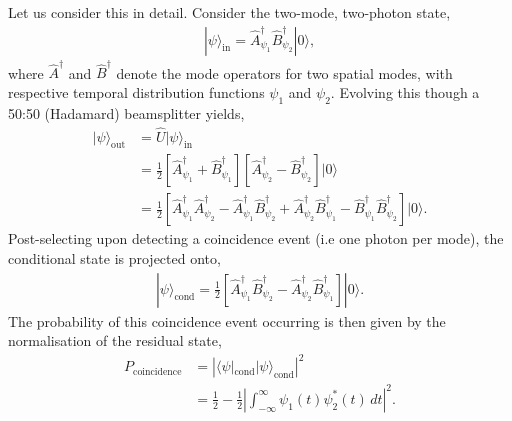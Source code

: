 \documentclass[aps, rmp, twocolumn, amsmath, amssymb, nofootinbib, superscriptaddress, longbibliography, floatfix, table-of-contents, eqsecnum]{revtex4-1}
\newcommand{\bra}[1]{\langle#1|}
\newcommand{\ket}[1]{|#1\rangle}
\begin{document}
Let us consider this in detail. Consider the two-mode, two-photon state,
\begin{align}
\ket\psi_\text{in} = \hat{A}^\dag_{\psi_1} \hat{B}^\dag_{\psi_2} \ket{0},
\end{align}
where $\hat{A}^\dag$ and $\hat{B}^\dag$ denote the mode operators for two spatial modes, with respective temporal distribution functions $\psi_1$ and $\psi_2$. Evolving this though a 50:50 (Hadamard) beamsplitter yields,
\begin{align}
\ket\psi_\text{out} &= \hat{U} \ket\psi_\text{in} \\
&= \frac{1}{2} \left[\hat{A}^\dag_{\psi_1}+\hat{B}^\dag_{\psi_1}\right]\left[\hat{A}^\dag_{\psi_2}-\hat{B}^\dag_{\psi_2}\right] \ket{0} \nonumber \\
&= \frac{1}{2} \left[\hat{A}^\dag_{\psi_1}\hat{A}^\dag_{\psi_2} - \hat{A}^\dag_{\psi_1}\hat{B}^\dag_{\psi_2} + \hat{A}^\dag_{\psi_2}\hat{B}^\dag_{\psi_1} - \hat{B}^\dag_{\psi_1}\hat{B}^\dag_{\psi_2}\right] \ket{0} \nonumber.
\end{align}
Post-selecting upon detecting a coincidence event (i.e one photon per mode), the conditional state is projected onto,
\begin{align}
\ket\psi_\text{cond} = \frac{1}{2} \left[\hat{A}^\dag_{\psi_1}\hat{B}^\dag_{\psi_2} - \hat{A}^\dag_{\psi_2}\hat{B}^\dag_{\psi_1}\right] \ket{0}.
\end{align}
The probability of this coincidence event occurring is then given by the normalisation of the residual state,
\begin{align}
P_\text{coincidence} &= \left| \bra\psi_\text{cond} \ket\psi_\text{cond} \right|^2 \nonumber \\
&= \frac{1}{2} - \frac{1}{2} \left| \int^\infty_{-\infty} \psi_1(t)\psi_2^*(t)\,dt\right|^2.
\end{align}
\end{document}
